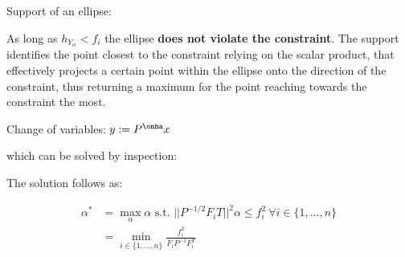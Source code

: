 \documentclass[8pt,a4paper]{scrartcl}
\begin{document}
\begin{multicols*}{3}
\begin{multicols*}{4}
{Support of an ellipse:


As long as $h_{Y_\alpha}<f_i$ the ellipse \textbf{does not violate the constraint}. The support identifies the point closest to the constraint relying on the scalar product, that effectively projects a certain point within the ellipse onto the direction of the constraint, thus returning a maximum for the point reaching towards the constraint the most.
}%

\begin{center}
\graphicspath{{Pictures/}}
\def\svgwidth{0.8\linewidth}

\end{center}

Change of variables: $y:=P^{\onha}x$


which can be solved by inspection:


The solution follows as:

\begin{align*}
\alpha^\ast&=\max\limits_{\alpha}\alpha\text{ s.t. }||P^{-1/2}F_iT||^2\alpha\leq f_i^2\ \forall i\in\{1,\ldots,n\} \\
&= \min\limits_{i\in\{1,\ldots,n\}}\frac{f_i^2}{F_iP^{-1}F_i^T}
\end{align*}

\end{multicols*}
\end{multicols*}
\end{document}
